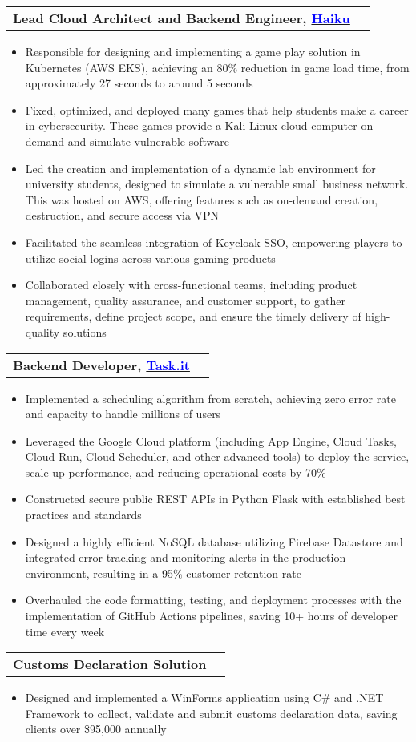 \documentclass[letterpaper,11pt]{article}
\makeatletter
\newcommand{\resumeItem}[1]{
  \item\small{
    {#1 \vspace{-2pt}}
  }
}
\newcommand{\resumeProjectHeading}[2]{
    \vspace{-2pt}\item
    \begin{tabular*}{0.97\textwidth}{l@{\extracolsep{\fill}}r}
      \small#1 & #2 \\
    \end{tabular*}\vspace{-7pt}
}
\newcommand{\resumeItemListStart}{\begin{itemize}}
\newcommand{\resumeItemListEnd}{\end{itemize}\vspace{-5pt}}
\makeatother
\begin{document}
\resumeProjectHeading
{\textbf{Lead Cloud Architect and Backend Engineer, {\href{https://haikuinc.io/}{\textcolor{blue}{Haiku}}}} \emph}{}
\resumeItemListStart
\resumeItem{Responsible for designing and implementing a game play solution in Kubernetes (AWS EKS), achieving an 80\% reduction in game load time, from approximately 27 seconds to around 5 seconds}
\resumeItem{Fixed, optimized, and deployed many games that help students make a career in cybersecurity. These games provide a Kali Linux cloud computer on demand and simulate vulnerable software}
\resumeItem{Led the creation and implementation of a dynamic lab environment for university students, designed to simulate a vulnerable small business network. This was hosted on AWS, offering features such as on-demand creation, destruction, and secure access via VPN}
\resumeItem{Facilitated the seamless integration of Keycloak SSO, empowering players to utilize social logins across various gaming products}
\resumeItem{Collaborated closely with cross-functional teams, including product management, quality assurance, and customer support, to gather requirements, define project scope, and ensure the timely delivery of high-quality solutions}
\resumeItemListEnd

\resumeProjectHeading
{\textbf{Backend Developer, {\href{https://www.task.it/}{\textcolor{blue}{Task.it}}}} \emph}{}
\resumeItemListStart
\resumeItem{Implemented a scheduling algorithm from scratch, achieving zero error rate and capacity to handle millions of users}
\resumeItem{Leveraged the Google Cloud platform (including App Engine, Cloud Tasks, Cloud Run, Cloud Scheduler, and other advanced tools) to deploy the service, scale up performance, and reducing operational costs by 70\%}
\resumeItem {Constructed secure public REST APIs in Python Flask with established best practices and standards}
\resumeItem{Designed a highly efficient NoSQL database utilizing Firebase Datastore and integrated error-tracking and monitoring alerts in the production environment, resulting in a 95\% customer retention rate}
\resumeItem{Overhauled the code formatting, testing, and deployment processes with the implementation of GitHub Actions pipelines, saving 10+ hours of developer time every week} 
\resumeItemListEnd

\resumeProjectHeading
{\textbf{Customs Declaration Solution} \emph}{}
\resumeItemListStart
\resumeItem{Designed and implemented a WinForms application using C\# and .NET Framework to collect, validate and submit customs declaration data, saving clients over \$95,000 annually}
\resumeItemListEnd
\end{document}
